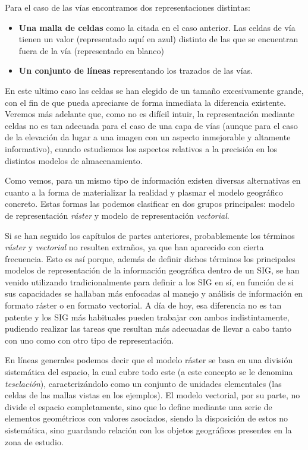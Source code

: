 \begin{multicols}{2}
Para el caso de las vías encontramos dos representaciones distintas:

\begin{itemize}
 \item \textbf{Una malla de celdas} como la citada en el caso anterior. Las celdas de vía tienen un valor (representado aquí en azul) distinto de las que se encuentran fuera de la vía (representado en blanco)
\item \textbf{Un conjunto de líneas} representando los trazados de las vías.
\end{itemize}

En este ultimo caso las celdas se han elegido de un tamaño excesivamente grande, con el fin de que pueda apreciarse de forma inmediata la diferencia existente. Veremos más adelante que, como no es difícil intuir, la representación mediante celdas no es tan adecuada para el caso de una capa de vías (aunque para el caso de la elevación da lugar a una imagen con un aspecto inmejorable y altamente informativo), cuando estudiemos los aspectos relativos a la precisión en los distintos modelos de almacenamiento. 

Como vemos, para un mismo tipo de información existen diversas alternativas en cuanto a la forma de materializar la realidad y plasmar el modelo geográfico concreto. Estas formas las podemos clasificar en dos grupos principales: modelo de representación \emph{ráster} y modelo de representación \emph{vectorial}. 


Si se han seguido los capítulos de partes anteriores, probablemente los términos \emph{ráster} y \emph{vectorial} no resulten extraños, ya que han aparecido con cierta frecuencia. Esto es así porque, además de definir dichos términos los principales modelos de representación de la información geográfica dentro de un SIG, se han venido utilizando tradicionalmente para definir a los SIG en sí, en función de si sus capacidades se hallaban más enfocadas al manejo y análisis de información en formato ráster o en formato vectorial. A día de hoy, esa diferencia no es tan patente y los SIG más habituales pueden trabajar con ambos indistintamente, pudiendo realizar las tareas que resultan más adecuadas de llevar a cabo tanto con uno como con otro tipo de representación. 

En líneas generales podemos decir que el modelo ráster se basa en una división sistemática del espacio, la cual cubre todo este (a este concepto se le denomina \emph{teselación}), caracterizándolo como un conjunto de unidades elementales (las celdas de las mallas vistas en los ejemplos). El modelo vectorial, por su parte, no divide el espacio completamente, sino que lo define mediante una serie de elementos geométricos con valores asociados, siendo la disposición de estos no sistemática, sino guardando relación con los objetos geográficos presentes en la zona de estudio.


\end{multicols}
